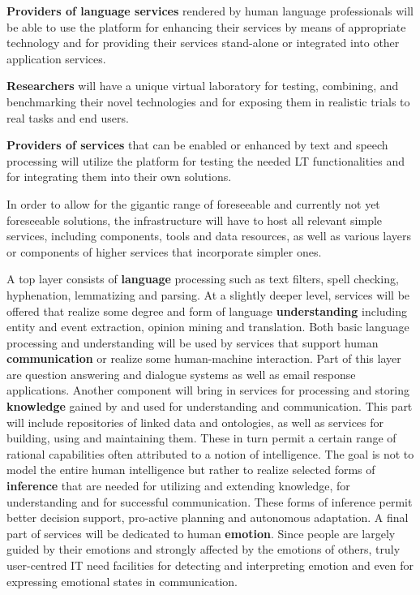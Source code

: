 \documentclass[10pt, plain]{../../metanetpaper}
\begin{document}
\begin{multicols}{2}
\textbf{Providers of language services} rendered by human language professionals will be able to use the platform for enhancing their services by means of appropriate technology and for providing their services stand-alone or integrated into other application services.
 
\textbf{Researchers} will have a unique virtual laboratory for testing, combining, and benchmarking their novel technologies and for exposing them in realistic trials to real tasks and end users.
 
\textbf{Providers of services} that can be enabled or enhanced by text and speech processing will utilize the platform for testing the needed LT functionalities
and for integrating them into their own solutions.
 
In order to allow for the gigantic range of foreseeable and currently not yet foreseeable solutions, the infrastructure will have to host all relevant simple services, including components, tools and data resources, as well as various layers or components of higher services that incorporate simpler ones.
 
A top layer consists of \textbf{language} processing such as text filters, spell checking, hyphenation, lemmatizing and parsing. At a slightly deeper level, services will be offered that realize some degree and form of language \textbf{understanding} including entity and event extraction, opinion mining and translation. Both basic language processing and understanding will be used by services that support human \textbf{communication} or realize some human-machine interaction. Part of this layer are question answering and dialogue systems as well as email response applications. Another component will bring in services for processing and storing \textbf{knowledge} gained by and used for understanding and communication. This part will include repositories of linked data and ontologies, as well as services for building, using and maintaining them. These in turn permit a certain range of rational capabilities often attributed to a notion of intelligence. The goal is not to model the entire human intelligence but rather to realize selected forms of \textbf{inference} that are needed for utilizing and extending knowledge, for understanding and for successful communication. These forms of inference permit better decision support, pro-active planning and autonomous adaptation. A final part of services will be dedicated to human \textbf{emotion}.  Since people are largely guided by their emotions and strongly affected by the emotions of others, truly user-centred IT need facilities for detecting and interpreting emotion and even for expressing emotional states in communication.
 

\end{multicols}
\end{document}
